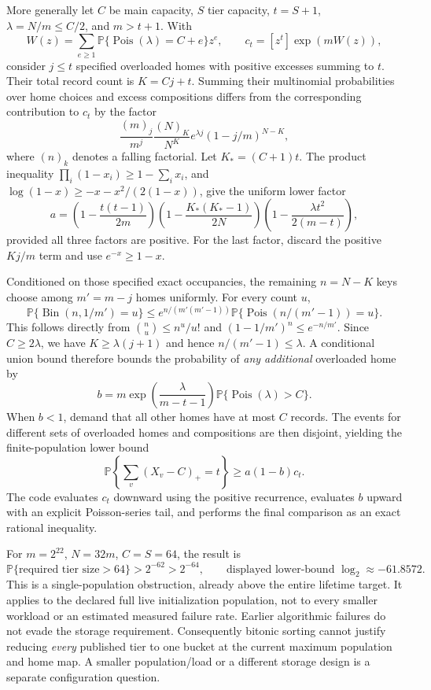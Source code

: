 \documentclass[11pt]{article}
\theoremstyle{definition}
\theoremstyle{remark}
\newcommand{\Prb}{\mathbb P}
\newcommand{\Pois}{\operatorname{Pois}}
\newcommand{\Bin}{\operatorname{Bin}}
\begin{document}
More generally let $C$ be main capacity, $S$ tier capacity, $t=S+1$,
$\lambda=N/m\le C/2$, and $m>t+1$. With
\[
 W(z)=\sum_{e\ge1}\Prb\{\Pois(\lambda)=C+e\}z^e,
 \qquad c_t=[z^t]\exp(mW(z)),
\]
consider $j\le t$ specified overloaded homes with positive excesses summing
to $t$. Their total record count is $K=Cj+t$. Summing their multinomial
probabilities over home choices and excess compositions differs from the
corresponding contribution to $c_t$ by the factor
\[
 \frac{(m)_j}{m^j}\frac{(N)_K}{N^K}
           e^{\lambda j}(1-j/m)^{N-K},
\]
where $(n)_k$ denotes a falling factorial. Let $K_*=(C+1)t$. The product
inequality $\prod_i(1-x_i)\ge1-\sum_i x_i$, and
$\log(1-x)\ge-x-x^2/(2(1-x))$, give the uniform lower factor
\[
 a=\left(1-\frac{t(t-1)}{2m}\right)
   \left(1-\frac{K_*(K_*-1)}{2N}\right)
   \left(1-\frac{\lambda t^2}{2(m-t)}\right),
\]
provided all three factors are positive. For the last factor, discard the
positive $Kj/m$ term and use $e^{-x}\ge1-x$.

Conditioned on those specified exact occupancies, the remaining
$n=N-K$ keys choose among $m'=m-j$ homes uniformly. For every count $u$,
\[
 \Prb\{\Bin(n,1/m')=u\}
 \le e^{n/(m'(m'-1))}
         \Prb\{\Pois(n/(m'-1))=u\}.
\]
This follows directly from $\binom nu\le n^u/u!$ and
$(1-1/m')^n\le e^{-n/m'}$. Since $C\ge2\lambda$, we have
$K\ge\lambda(j+1)$ and hence $n/(m'-1)\le\lambda$. A conditional union
bound therefore bounds the probability of \emph{any additional} overloaded
home by
\[
 b=m\exp\!\left(\frac{\lambda}{m-t-1}\right)
                  \Prb\{\Pois(\lambda)>C\}.
\]
When $b<1$, demand that all other homes have at most $C$ records. The
events for different sets of overloaded homes and compositions are then
disjoint, yielding the finite-population lower bound
\[
 \Prb\!\left\{\sum_v(X_v-C)_+=t\right\}\ge a(1-b)c_t.
\]
The code evaluates $c_t$ downward using the positive recurrence, evaluates
$b$ upward with an explicit Poisson-series tail, and performs the final
comparison as an exact rational inequality.

For $m=2^{22}$, $N=32m$, $C=S=64$, the result is
\[
 \Prb\{\text{required tier size}>64\}>2^{-62}>2^{-64},
 \qquad \text{displayed lower-bound }\log_2\approx-61.8572.
\]
This is a single-population obstruction, already above the entire lifetime
target. It applies to the declared full live initialization population,
not to every smaller workload or an estimated measured failure rate.
Earlier algorithmic failures do not evade the storage requirement.
Consequently bitonic sorting cannot justify reducing \emph{every}
published tier to one bucket at the current maximum population and home
map. A smaller population/load or a different storage design is a separate
configuration question.
\end{document}
